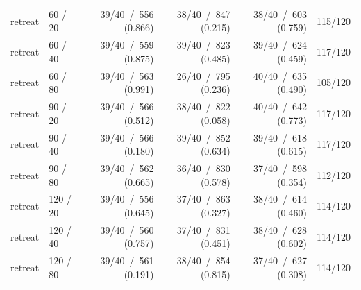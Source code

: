\begin{tabular}{llrrrr}
retreat & 60 / 20 & 39/40 \,/\, 556 (0.866) & 38/40 \,/\, 847 (0.215) & 38/40 \,/\, 603 (0.759) & 115/120 \\
retreat & 60 / 40 & 39/40 \,/\, 559 (0.875) & 39/40 \,/\, 823 (0.485) & 39/40 \,/\, 624 (0.459) & 117/120 \\
retreat & 60 / 80 & 39/40 \,/\, 563 (0.991) & 26/40 \,/\, 795 (0.236) & 40/40 \,/\, 635 (0.490) & 105/120 \\
retreat & 90 / 20 & 39/40 \,/\, 566 (0.512) & 38/40 \,/\, 822 (0.058) & 40/40 \,/\, 642 (0.773) & 117/120 \\
retreat & 90 / 40 & 39/40 \,/\, 566 (0.180) & 39/40 \,/\, 852 (0.634) & 39/40 \,/\, 618 (0.615) & 117/120 \\
retreat & 90 / 80 & 39/40 \,/\, 562 (0.665) & 36/40 \,/\, 830 (0.578) & 37/40 \,/\, 598 (0.354) & 112/120 \\
retreat & 120 / 20 & 39/40 \,/\, 556 (0.645) & 37/40 \,/\, 863 (0.327) & 38/40 \,/\, 614 (0.460) & 114/120 \\
retreat & 120 / 40 & 39/40 \,/\, 560 (0.757) & 37/40 \,/\, 831 (0.451) & 38/40 \,/\, 628 (0.602) & 114/120 \\
retreat & 120 / 80 & 39/40 \,/\, 561 (0.191) & 38/40 \,/\, 854 (0.815) & 37/40 \,/\, 627 (0.308) & 114/120 \\
\bottomrule
\end{tabular}%
